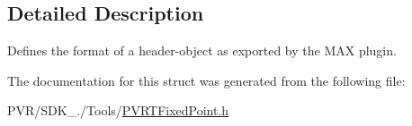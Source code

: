 \subsection{Detailed Description}
Defines the format of a header-\/object as exported by the M\+A\+X plugin. 



 

The documentation for this struct was generated from the following file\+:\begin{DoxyCompactItemize}
\item 
P\+V\+R/\+S\+D\+K\+\_./\+Tools/\hyperlink{_p_v_r_t_fixed_point_8h}{P\+V\+R\+T\+Fixed\+Point.\+h}\end{DoxyCompactItemize}

